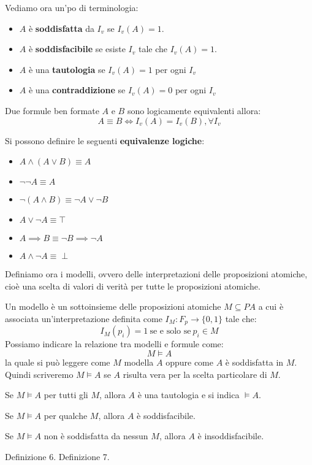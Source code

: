 Vediamo ora un'po di terminologia:
\begin{itemize}
    \item $A$ è \textbf{soddisfatta} da $I_v$ se $I_v(A) = 1$.
    \item $A$ è \textbf{soddisfacibile} se esiste $I_v$ tale che $I_v(A) = 1$.
    \item $A$ è una \textbf{tautologia} se $I_v(A) = 1$ per ogni $I_v$
    \item $A$ è una \textbf{contraddizione} se $I_v(A) = 0$ per ogni $I_v$
\end{itemize}
\begin{definizione}
    Due formule ben formate $A$ e $B$ sono logicamente equivalenti allora:
    \begin{equation}
        A\equiv B \iff I_v(A)=I_v(B), \forall I_v
    \end{equation}
\end{definizione}

Si possono definire le seguenti \textbf{equivalenze logiche}:
\begin{itemize}
    \item $A\land (A\lor B)\equiv A$
    \item $\lnot \lnot A\equiv A $
    \item $\lnot (A\land B) \equiv \lnot A\lor \lnot B$
    \item $A\lor \lnot A\equiv \top$
    \item $A\implies B\equiv \lnot B\implies \lnot A$
    \item $A\land \lnot A\equiv\perp$
\end{itemize}
\begin{definizione}
    Definiamo ora i modelli, ovvero delle interpretazioni delle proposizioni
    atomiche, cioè una scelta di valori di verità per tutte le proposizioni atomiche.

    Un modello è un sottoinsieme delle proposizioni atomiche $M \subseteq PA$ a
    cui è associata un'interpretazione definita come $I_M: F_p \to \{0, 1\}$ tale che:
    \begin{equation}
        I_M(p_i) = 1 \ \text{se e solo se} \ p_i \in M
    \end{equation}
    Possiamo indicare la relazione tra modelli e formule come:
    \begin{equation}
        M \models A
    \end{equation}
    la quale si può leggere come $M$ modella $A$ oppure come $A$ è soddisfatta
    in $M$. Quindi scriveremo $M \models A$ se $A$ risulta vera per la scelta
    particolare di $M$.
\end{definizione}
\begin{definizione}
    Se $M \models A$ per tutti gli $M$, allora $A$ è una tautologia e si indica
    $\models A$.
\end{definizione}
\begin{definizione}
    Se $M \models A$ per qualche $M$, allora $A$ è soddisfacibile.
\end{definizione}
\begin{definizione}
    Se $M \models A$ non è soddisfatta da nessun $M$, allora $A$ è insoddisfacibile.
\end{definizione}
Definizione 6.
Definizione 7.
